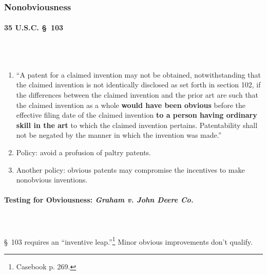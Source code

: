 \subsubsection{Nonobviousness}

\paragraph{35 U.S.C. \S\ 103}
~\\\\
\begin{enumerate}
    \item ``A patent for a claimed invention may not be obtained, 
    notwithstanding that the claimed invention is not identically disclosed as 
    set forth in section 102, if the differences between the claimed invention 
    and the prior art are such that the claimed invention as a whole 
    \textbf{would have been obvious} before the effective filing date of the 
    claimed invention \textbf{to a person having ordinary skill in the art} to 
    which the claimed invention pertains. Patentability shall not be negated 
    by the manner in which the invention was made.''
    \item Policy: avoid a profusion of paltry patents.
    \item Another policy: obvious patents may compromise the incentives to 
    make nonobvious inventions.
\end{enumerate}

\paragraph{Testing for Obviousness: \emph{Graham v. John Deere Co.}}
~\\\\
\S\ 103 requires an ``inventive leap.''\footnote{Casebook p. 269.} Minor obvious 
improvements don't qualify.

